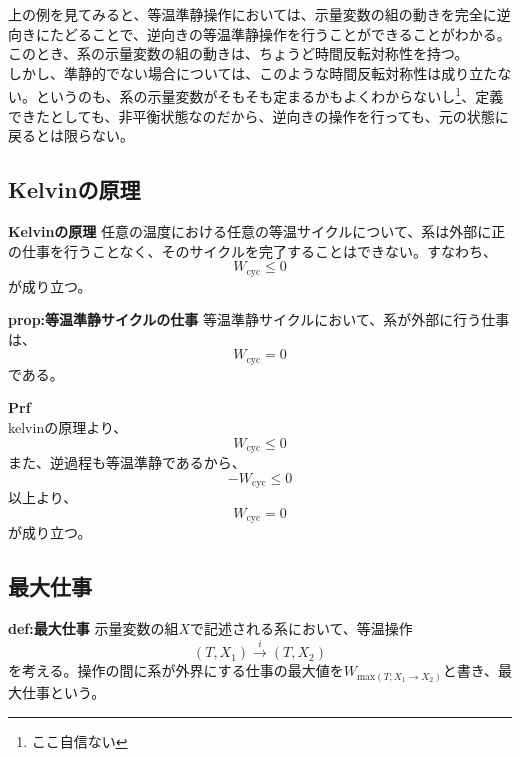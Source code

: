 \documentclass[a4paper,11pt]{jsarticle}
\begin{document}
上の例を見てみると、等温準静操作においては、示量変数の組の動きを完全に逆向きにたどることで、逆向きの等温準静操作を行うことができることがわかる。このとき、系の示量変数の組の動きは、ちょうど時間反転対称性を持つ。\\
しかし、準静的でない場合については、このような時間反転対称性は成り立たない。というのも、系の示量変数がそもそも定まるかもよくわからないし\footnote{ここ自信ない}、定義できたとしても、非平衡状態なのだから、逆向きの操作を行っても、元の状態に戻るとは限らない。


\subsection{Kelvinの原理}
\begin{itembox}[l]{\textbf{Kelvinの原理}}
    任意の温度における任意の等温サイクルについて、系は外部に正の仕事を行うことなく、そのサイクルを完了することはできない。すなわち、
    \begin{equation}
        W_{\text{cyc}} \leq 0
    \end{equation}
    が成り立つ。
\end{itembox}

\begin{itembox}[l]{\textbf{prop:等温準静サイクルの仕事}}
    等温準静サイクルにおいて、系が外部に行う仕事は、
    \begin{equation}
        W_{\text{cyc}} = 0
    \end{equation}
    である。
\end{itembox}
\textbf{Prf}\\
kelvinの原理より、
\begin{equation}
    W_{\text{cyc}} \leq 0
\end{equation}
また、逆過程も等温準静であるから、
\begin{equation}
    -W_{\text{cyc}} \leq 0
\end{equation}
以上より、
\begin{equation}
    W_{\text{cyc}} = 0
\end{equation}
が成り立つ。\\

\subsection{最大仕事}
\begin{itembox}[l]{\textbf{def:最大仕事}}
    示量変数の組$X$で記述される系において、等温操作
    \begin{equation}
        (T,X_1) \xrightarrow{i} (T,X_2)
    \end{equation}
    を考える。操作の間に系が外界にする仕事の最大値を$W_{\text{max}(T;X_1\rightarrow X_2)}$と書き、最大仕事という。
\end{itembox}
\end{document}
